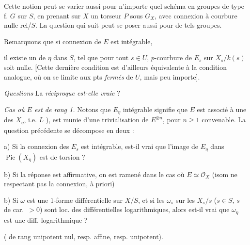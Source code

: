 \documentclass[11pt,a4paper]{article}
\begin{document}
Cette notion peut se varier aussi pour n'importe quel schéma en
groupes de type f. $G$ sur $S$, en prenant sur $X$ un torseur $P$ sous $G_X$,
avec connexion à courbure nulle rel/$S$. La question qui suit peut
se poser aussi pour de tels groupes.

Remarquons que si  connexion de $E$ est intégrable, 

il existe un    de $\eta$ dans $S$, tel que pour tout $s\in U$,    $p$-courbure de $E_s$ sur $X_s/k(s)$ soit nulle.
[Cette dernière condition est d'ailleurs équivalente à la condition analogue,
\struck{\ill{}} où on se limite aux pts \emph{fermés} de $U$, mais peu
importe].

\emph{Questions} La \emph{réciproque est-elle vraie} ?

\emph{Cas \struck{\ill{}} où $E$ est de rang 1.} Notons que \struck{\ill{}}
$E_\eta$ intégrable signifie que $E$ est associé à une 
\struck{\ill{}} des $X_\eta$, i.e.  $L$ ),
 est munie d'une trivialisation de $E^{\otimes n}$, pour
$n\geq 1$ convenable. La question précédente se décompose en deux :

a) Si la connexion des $E_s$  est
intégrable, est-il vrai que l'image de $E_\eta$ dans $\operatorname{Pic}(X_\eta)$
est de torsion ?

b) Si la réponse est affirmative, on est ramené dans le cas où $E\simeq
\mathcal{O}_X$ (isom ne respectant pas la connexion, à priori)

b) Si $\omega$ est une $1$-forme différentielle \add{[fermée]} sur $X/S$, et
si les $\omega_s$ sur les $X_s/s$ ($s\in S$, $s$ de car.~$>0$) sont loc. des
différentielles logarithmiques, alors est-il vrai que  $\omega_\eta$ est une diff. logarithmique ?

( de rang unipotent nul, resp. affine, resp. unipotent).
\end{document}
